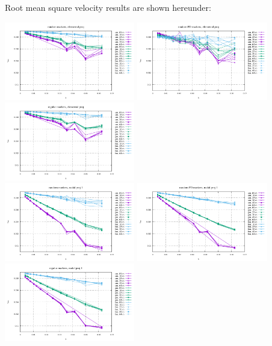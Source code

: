 \newpage
Root mean square velocity results are shown hereunder:
\begin{center}
\includegraphics[width=5.7cm]{python_codes/fieldstone_13/RESULTS/vrms_rand_proj0} 
\includegraphics[width=5.7cm]{python_codes/fieldstone_13/RESULTS/vrms_poissondisc_proj0} 
\includegraphics[width=5.7cm]{python_codes/fieldstone_13/RESULTS/vrms_reg_proj0}\\
\includegraphics[width=5.7cm]{python_codes/fieldstone_13/RESULTS/vrms_rand_proj1} 
\includegraphics[width=5.7cm]{python_codes/fieldstone_13/RESULTS/vrms_poissondisc_proj1} 
\includegraphics[width=5.7cm]{python_codes/fieldstone_13/RESULTS/vrms_reg_proj1}\\ 

\end{center}
